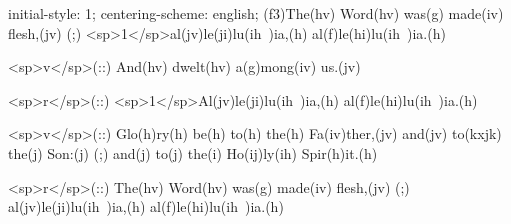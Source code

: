 initial-style: 1;
centering-scheme: english;
(f3)The(hv) Word(hv) was(g) made(iv) flesh,(jv) (;) <sp>1</sp>al(jv)le(ji)lu(ih~)ia,(h) al(f)le(hi)lu(ih~)ia.(h)

<sp>v</sp>(::) And(hv) dwelt(hv) a(g)mong(iv) us.(jv)

<sp>r</sp>(::) <sp>1</sp>Al(jv)le(ji)lu(ih~)ia,(h) al(f)le(hi)lu(ih~)ia.(h)

<sp>v</sp>(::) Glo(h)ry(h) be(h) to(h) the(h) Fa(iv)ther,(jv) and(jv) to(kxjk) the(j) Son:(j) (;) and(j) to(j) the(i) Ho(ij)ly(ih) Spir(h)it.(h)

<sp>r</sp>(::) The(hv) Word(hv) was(g) made(iv) flesh,(jv) (;) al(jv)le(ji)lu(ih~)ia,(h) al(f)le(hi)lu(ih~)ia.(h)